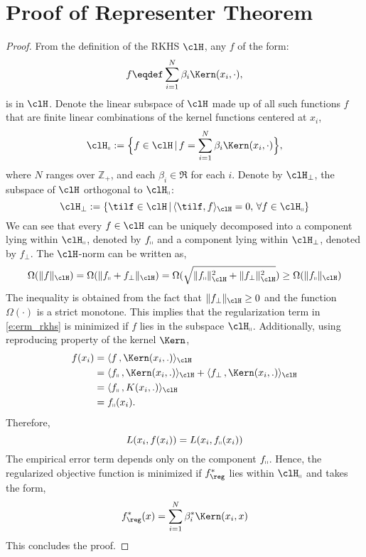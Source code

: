 \chapter{Proof of Representer Theorem }%
\label{a:reptheorem}

\begin{proof}
	From the definition of the RKHS $\clH$, any $f$ of the form:
	\[
	f \eqdef \sum_{i=1}^N  
	\beta_i \Kern(x_i,\cdot),
	\]
	is in $\clH$. 	
	Denote the linear subspace of $\clH$ made up of all such functions $f$ that are finite linear combinations of the kernel functions centered at $x_i$,
	\[
	\clH_\shortparallel := \Bigl\{f \in \clH\, |\, f = \sum_{i=1}^N  \beta_i \Kern(x_i,\cdot) \Bigr\},
	\]
	where $N$ ranges over $\mathbb{Z}_+$, and  each $\beta_i \in \Re$ for each $i$. Denote by $\clH_{\perp}$, the subspace of $\clH$ orthogonal to $\clH_\shortparallel$:
	\[
	\clH_\perp : = \{ \tilf \in \clH\,| \, \langle \tilf , f \rangle_\clH = 0 ,\, \forall f \in \clH_\shortparallel \}
	\]
	We can see that every $f \in \clH$ can be uniquely decomposed into a component lying within $\clH_\shortparallel$, denoted by $f_\shortparallel$ and a component lying within $\clH_\perp$, denoted by $f_\perp$.
	The $\clH$-norm can be written as,
	\[
	\Omega(\|f\|_\clH) = \Omega( \|f_\shortparallel + f_\perp\|_\clH) =\Omega( \sqrt{\|f_\shortparallel\|^2_\clH + \|f_\perp\|^2_\clH})  \geq \Omega(\|f_\shortparallel\|_\clH)
	\]
	The inequality is obtained from the fact that $\|f_\perp\|_\clH \geq 0$ and the function $\Omega(\cdot)$ is a strict monotone.
	This implies that the regularization term in \eqref{e:erm_rkhs} is minimized if $f$ lies in the subspace $\clH_\shortparallel$.
	Additionally, using reproducing property of the kernel $\Kern$,
	\[
	\begin{aligned}
	f(x_i) & =  \langle f \, , \Kern(x_i,.) \rangle_\clH\\
	&  = \langle f_\shortparallel\, , \Kern(x_i,.) \rangle_\clH + \langle f_\perp \, , \Kern(x_i,.) \rangle_\clH \\
	&  = \langle f_\shortparallel\, , K(x_i,.) \rangle_\clH \\
	&  = f_\shortparallel(x_i).
	\end{aligned}
	\]
	Therefore,
	\[
	L(x_i, f(x_i)) = L(x_i, f_\shortparallel(x_i))
	\]
	The empirical error term depends only on the component $f_\shortparallel$. Hence, the regularized objective function is minimized if $f_\reg^*$ lies within $\clH_\shortparallel$ and takes the form,
	\[
	f_\reg^*(x) = \sum_{i=1}^N  \beta_i^*  \Kern(x_i, x)
	\]
	This concludes the proof. 
\end{proof}